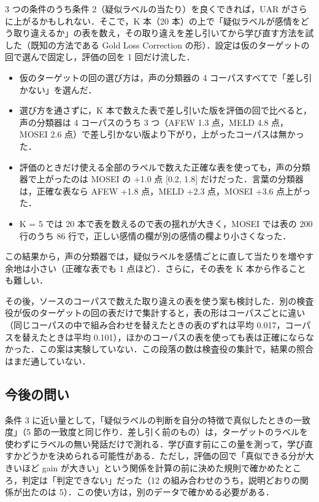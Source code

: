 \documentclass[a4paper,11pt]{ltjsarticle}
\begin{document}
3 つの条件のうち条件 2（疑似ラベルの当たり）を良くできれば，UAR がさらに上がるかもしれない．そこで，K 本（20 本）の上で「疑似ラベルが感情をどう取り違えるか」の表を数え，その取り違えを差し引いてから学び直す方法を試した（既知の方法である Gold Loss Correction の形）．設定は仮のターゲットの回で選んで固定し，評価の回を 1 回だけ流した．
\begin{itemize}
  \item 仮のターゲットの回の選び方は，声の分類器の 4 コーパスすべてで「差し引かない」を選んだ．
  \item 選び方を通さずに，K 本で数えた表で差し引いた版を評価の回で比べると，声の分類器は 4 コーパスのうち 3 つ（AFEW \textminus{}1.3 点，MELD \textminus{}4.8 点，MOSEI \textminus{}2.6 点）で差し引かない版より下がり，上がったコーパスは無かった．
  \item 評価のときだけ使える全部のラベルで数えた正確な表を使っても，声の分類器で上がったのは MOSEI の +1.0 点 [0.2, 1.8] だけだった．言葉の分類器は，正確な表なら AFEW +1.8 点，MELD +2.3 点，MOSEI +3.6 点上がった．
  \item K = 5 では 20 本で表を数えるので表の揺れが大きく，MOSEI では表の 200 行のうち 86 行で，正しい感情の欄が別の感情の欄より小さくなった．
\end{itemize}
この結果から，声の分類器では，疑似ラベルを感情ごとに直して当たりを増やす余地は小さい（正確な表でも 1 点ほど）．さらに，その表を K 本から作ることも難しい．

その後，ソースのコーパスで数えた取り違えの表を使う案も検討した．別の検査役が仮のターゲットの回の表だけで集計すると，表の形はコーパスごとに違い（同じコーパスの中で組み合わせを替えたときの表のずれは平均 0.017，コーパスを替えたときは平均 0.101），ほかのコーパスの表を使っても表は正確にならなかった．この案は実験していない．この段落の数は検査役の集計で，結果の照合はまだ通していない．

\subsection{今後の問い}

条件 3 に近い量として，「疑似ラベルの判断を自分の特徴で真似したときの一致度」（5 節の一致度と同じ作り．差し引く前のもの）は，ターゲットのラベルを使わずにラベルの無い発話だけで測れる．学び直す前にこの量を測って，学び直すかどうかを決められる可能性がある．ただし，評価の回で「真似できる分が大きいほど gain が大きい」という関係を計算の前に決めた規則で確かめたところ，判定は「判定できない」だった（12 の組み合わせのうち，説明どおりの関係が出たのは 5）．この使い方は，別のデータで確かめる必要がある．
\end{document}
